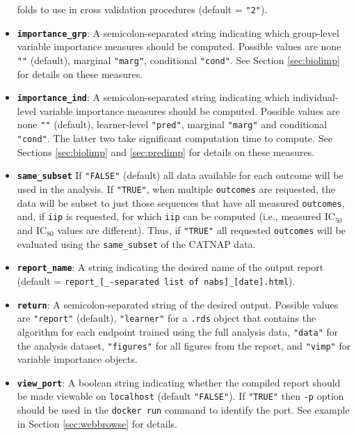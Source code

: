 \documentclass[]{article}
\begin{document}
\begin{itemize}
  folds to use in cross validation procedures (default = \texttt{"2"}).
\item
  \textbf{\texttt{importance\_grp}}: A semicolon-separated string
  indicating which group-level variable importance measures should be
  computed. Possible values are none \texttt{""} (default), marginal
  \texttt{"marg"}, conditional \texttt{"cond"}. See Section
  \ref{sec:biolimp} for details on these measures.
\item
  \textbf{\texttt{importance\_ind}}: A semicolon-separated string
  indicating which individual-level variable importance measures should
  be computed. Possible values are none \texttt{""} (default),
  learner-level \texttt{"pred"}, marginal \texttt{"marg"} and
  conditional \texttt{"cond"}. The latter two take significant
  computation time to compute. See Sections \ref{sec:biolimp} and
  \ref{sec:predimp} for details on these measures.
\item
  \textbf{\texttt{same\_subset}} If \texttt{"FALSE"} (default) all data
  available for each outcome will be used in the analysis. If
  \texttt{"TRUE"}, when multiple \texttt{outcomes} are requested, the
  data will be subset to just those sequences that have all measured
  \texttt{outcomes}, and, if \texttt{iip} is requested, for which
  \texttt{iip} can be computed (i.e., measured IC\(_{50}\) and
  IC\(_{80}\) values are different). Thus, if \texttt{"TRUE"} all
  requested \texttt{outcomes} will be evaluated using the
  \texttt{same\_subset} of the CATNAP data.
\item
  \textbf{\texttt{report\_name}}: A string indicating the desired name
  of the output report (default =
  \texttt{report\_{[}\_-separated\ list\ of\ nabs{]}\_{[}date{]}.html}).
\item
  \textbf{\texttt{return}}: A semicolon-separated string of the desired
  output. Possible values are \texttt{"report"} (default),
  \texttt{"learner"} for a \texttt{.rds} object that contains the
  algorithm for each endpoint trained using the full analysis data,
  \texttt{"data"} for the analysis dataset, \texttt{"figures"} for all
  figures from the report, and \texttt{"vimp"} for variable importance
  objects.
\item
  \textbf{\texttt{view\_port}}: A boolean string indicating whether the
  compiled report should be made viewable on \texttt{localhost} (default
  \texttt{"FALSE"}). If \texttt{"TRUE"} then \texttt{-p} option should
  be used in the \texttt{docker\ run} command to identify the port. See
  example in Section \ref{sec:webbrowse} for details.
\end{itemize}
\end{document}
